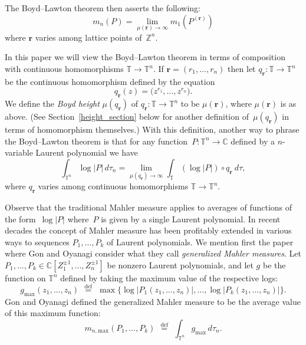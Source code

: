 \documentclass[12pt]{amsart}
\theoremstyle{plain}
\theoremstyle{definition}
\theoremstyle{remark}
\numberwithin{theorem}{section}
\numberwithin{equation}{section} %
\newcommand{\defeq}{\stackrel{\mathrm{def}}{\, = \,}}
\newcommand{\bZ}{{\mathbb{Z}}}
\newcommand{\bC}{{\mathbb{C}}}
\newcommand{\mb}{\mathbf}
\newcommand{\torus}{{\mathbb{T}}}
\begin{document}
The Boyd--Lawton theorem then asserts the following:
$$
m_n(P) = \lim_{\mu\left({\mb r}\right) \to\infty} m_1\left(P^{(\mb r)}\right)
$$
where ${\mb r}$ varies among lattice points of~$\bZ^n$.

In this paper we will view the  Boyd--Lawton theorem in terms of composition with continuous homomorphisms $\torus \to \torus^n$.
If $\mb r = (r_1, \ldots, r_n)$ then let $q_{\mb r} \colon \torus \to \torus^n$ be the continuous 
homomorphism defined by the equation
$$
q_{\mb r} (z) = \big(z^{r_1}, \ldots, z^{r_n}\big).
$$
We define the \emph{Boyd height} $\mu\left( q_{\mb r} \right)$ of $q_{\mb r} \colon \torus \to \torus^n$ to be $\mu(\mb r)$, where $\mu(\mb r)$ is as above.
(See Section~\ref{height_section}  below for another definition of~$\mu\left(q_{\mb r}\right)$ in terms of homomorphism themselves.)
With this definition, another way to phrase the Boyd--Lawton theorem is that for any function~$P \colon \torus^n \to \bC$ defined by a $n$-variable Laurent polynomial we have
$$
\int_{\torus^n} \log |P| \, d\tau_n =   \lim_{\mu\left(q_{\mb r}\right) \to\infty}  \int_\torus (\log|P|) \circ q_{\mb r}\ d\tau,
$$
where $q_{\mb r}$ varies among continuous homomorphisms $\torus\to \torus^n$.





Observe that the traditional Mahler measure 
applies to averages of functions of the form~$\log |P|$ where~$P$ is given by a single Laurent polynomial.
In recent decades the concept of Mahler measure has been profitably extended in various ways to sequences $P_1, \ldots, P_k$ of Laurent polynomials. 
We mention first the paper~\cite{GonOyanagi2004}
where Gon and Oyanagi consider what they call \emph{generalized Mahler measures}.
Let $P_1, \ldots, P_k \in \bC\left[Z^{\pm 1}_1, \ldots, Z^{\pm 1}_n\right]$ be nonzero Laurent polynomials, and
let $g$ be the function on $\torus^n$ defined by taking the maximum value
of the respective logs:
$$
g_{\mathrm{max}} (z_1, \ldots, z_n)\;  \defeq  \; \max \{ \log|P_1(z_1, \ldots, z_n)|, \ldots, \log|P_k(z_1, \ldots, z_n)| \}.
$$
Gon and Oyanagi  defined the generalized Mahler measure to be the average value of this maximum function:
$$
m_{n, \mathrm{max}} (P_1, \ldots, P_k) \; \defeq \; \int_{\torus^n} g_{\mathrm{max}}  \, d\tau_n.
$$
\end{document}
